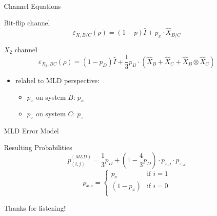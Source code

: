 \documentclass{beamer}
\begin{document}
\begin{frame}{Channel Equations}
    \begin{block}{Bit-flip channel}
        \begin{equation*}
        \varepsilon_{X,B/C}(\rho) = (1-p) \hat{I}+ p_x \cdot \hat{X}_{B/C} 
        \end{equation*}
    \end{block}
    \begin{block}{$X_2$ channel}
        \begin{equation*}
        \varepsilon_{X_2,BC}(\rho) = (1-p_D) \hat{I} + \frac{1}{3} p_D \cdot \left(\hat{X}_B + \hat{X}_C + \hat{X}_B\otimes\hat{X}_C\right) 
        \end{equation*}
    \end{block}

    \begin{itemize}
        \item relabel to MLD perspective: 
        \begin{itemize}
            \item $p_x$ on system $B$: $p_x$
            \item $p_x$ on system $C$: $p_z$ 
        \end{itemize}
    \end{itemize}
\end{frame}

\begin{frame}{MLD Error Model}
    \begin{block}{Resulting Probabilities}
        \begin{equation*}
            p_{(i,j)}^{(MLD)} = \frac{1}{3}p_{D} + (1- \frac{4}{3}p_D)\cdot p_{x,i} \cdot p_{z,j}
        \end{equation*}
        \vspace{0.5cm}
        \begin{equation*}
            p_{x,i} = 
            \begin{cases}
                p_x & \text{if } i=1  \\
                (1-p_x) & \text{if } i=0\\
            \end{cases}
        \end{equation*}
    \end{block}
\end{frame}

\begin{frame}
    \begin{center}
        Thanks for listening!
    \end{center}  
\end{frame}
\end{document}
